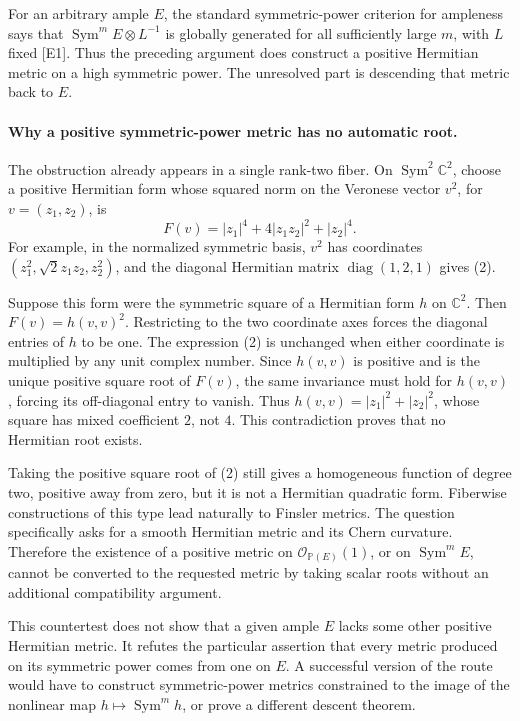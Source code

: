 \documentclass[11pt]{article}
\begin{document}
For an arbitrary ample $E$, the standard symmetric-power criterion for ampleness says that $\operatorname{Sym}^mE\otimes L^{-1}$ is globally generated for all sufficiently large $m$, with $L$ fixed [E1]. Thus the preceding argument does construct a positive Hermitian metric on a high symmetric power. The unresolved part is descending that metric back to $E$.

\paragraph{Why a positive symmetric-power metric has no automatic root.}
The obstruction already appears in a single rank-two fiber. On $\operatorname{Sym}^2\mathbb C^2$, choose a positive Hermitian form whose squared norm on the Veronese vector $v^2$, for $v=(z_1,z_2)$, is
\[
 F(v)=|z_1|^4+4|z_1z_2|^2+|z_2|^4.                        \tag{2}
\]
For example, in the normalized symmetric basis, $v^2$ has coordinates $(z_1^2,\sqrt2z_1z_2,z_2^2)$, and the diagonal Hermitian matrix $\operatorname{diag}(1,2,1)$ gives (2).

Suppose this form were the symmetric square of a Hermitian form $h$ on $\mathbb C^2$. Then $F(v)=h(v,v)^2$. Restricting to the two coordinate axes forces the diagonal entries of $h$ to be one. The expression (2) is unchanged when either coordinate is multiplied by any unit complex number. Since $h(v,v)$ is positive and is the unique positive square root of $F(v)$, the same invariance must hold for $h(v,v)$, forcing its off-diagonal entry to vanish. Thus $h(v,v)=|z_1|^2+|z_2|^2$, whose square has mixed coefficient $2$, not $4$. This contradiction proves that no Hermitian root exists.

Taking the positive square root of (2) still gives a homogeneous function of degree two, positive away from zero, but it is not a Hermitian quadratic form. Fiberwise constructions of this type lead naturally to Finsler metrics. The question specifically asks for a smooth Hermitian metric and its Chern curvature. Therefore the existence of a positive metric on $\mathcal O_{\mathbb P(E)}(1)$, or on $\operatorname{Sym}^mE$, cannot be converted to the requested metric by taking scalar roots without an additional compatibility argument.

This countertest does not show that a given ample $E$ lacks some other positive Hermitian metric. It refutes the particular assertion that every metric produced on its symmetric power comes from one on $E$. A successful version of the route would have to construct symmetric-power metrics constrained to the image of the nonlinear map $h\mapsto\operatorname{Sym}^m h$, or prove a different descent theorem.
\end{document}
